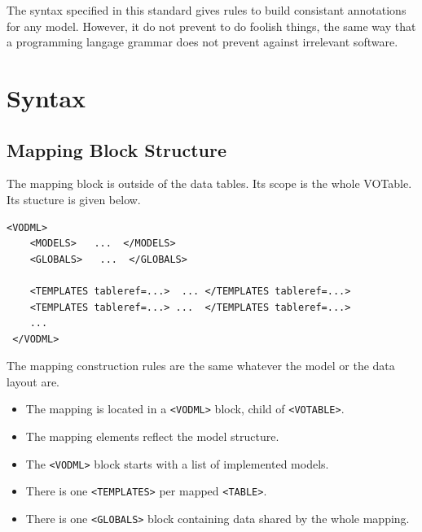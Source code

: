 \documentclass[11pt,a4paper]{ivoa}
\begin{document}
The syntax specified in this standard gives rules to build consistant annotations for any model. However, it do not prevent to do foolish things, the same way that a programming langage grammar does not prevent against irrelevant software.





\section{Syntax}

\subsection{Mapping Block Structure}

The mapping block is outside of the data tables. Its scope is the whole VOTable. Its stucture is given below.

\begin{lstlisting}[caption={INSTANCE bloc example},captionpos=b]
 <VODML>
    <MODELS>   ...  </MODELS>
    <GLOBALS>   ...  </GLOBALS>

    <TEMPLATES tableref=...>  ... </TEMPLATES tableref=...>
    <TEMPLATES tableref=...> ...  </TEMPLATES tableref=...>
    ...
 </VODML>
\end{lstlisting}

The mapping construction rules are the same whatever the model or the data layout are.

\begin{itemize}
    \item The mapping is located in a \texttt{<VODML>} block, child of \texttt{<VOTABLE>}.
    \item The mapping elements reflect the model structure.
    \item The \texttt{<VODML>} block starts with a list of implemented models.
    \item There is one \texttt{<TEMPLATES>} per mapped \texttt{<TABLE>}.
    \item There is one \texttt{<GLOBALS>} block containing data shared by the whole mapping.
\end{itemize}
\end{document}
